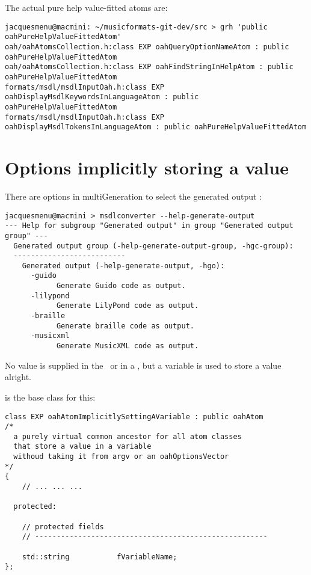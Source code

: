 The actual pure help value-fitted atoms are:
\begin{lstlisting}[language=Terminal]
jacquesmenu@macmini: ~/musicformats-git-dev/src > grh 'public oahPureHelpValueFittedAtom'
oah/oahAtomsCollection.h:class EXP oahQueryOptionNameAtom : public oahPureHelpValueFittedAtom
oah/oahAtomsCollection.h:class EXP oahFindStringInHelpAtom : public oahPureHelpValueFittedAtom
formats/msdl/msdlInputOah.h:class EXP oahDisplayMsdlKeywordsInLanguageAtom : public oahPureHelpValueFittedAtom
formats/msdl/msdlInputOah.h:class EXP oahDisplayMsdlTokensInLanguageAtom : public oahPureHelpValueFittedAtom
\end{lstlisting}


\section{Options implicitly storing a value}

There are options in multiGeneration to select the generated output :
\begin{lstlisting}[language=Terminal]
jacquesmenu@macmini > msdlconverter --help-generate-output
--- Help for subgroup "Generated output" in group "Generated output group" ---
  Generated output group (-help-generate-output-group, -hgc-group):
  --------------------------
    Generated output (-help-generate-output, -hgo):
      -guido
            Generate Guido code as output.
      -lilypond
            Generate LilyPond code as output.
      -braille
            Generate braille code as output.
      -musicxml
            Generate MusicXML code as output.
\end{lstlisting}

No value is supplied in the \CLI\ or in a , but a variable is used to store a value alright.

 is the base class for this:
\begin{lstlisting}[language=CPlusPlus]
class EXP oahAtomImplicitlySettingAVariable : public oahAtom
/*
  a purely virtual common ancestor for all atom classes
  that store a value in a variable
  withoud taking it from argv or an oahOptionsVector
*/
{
	// ... ... ...

  protected:

    // protected fields
    // ------------------------------------------------------

    std::string           fVariableName;
};
\end{lstlisting}

